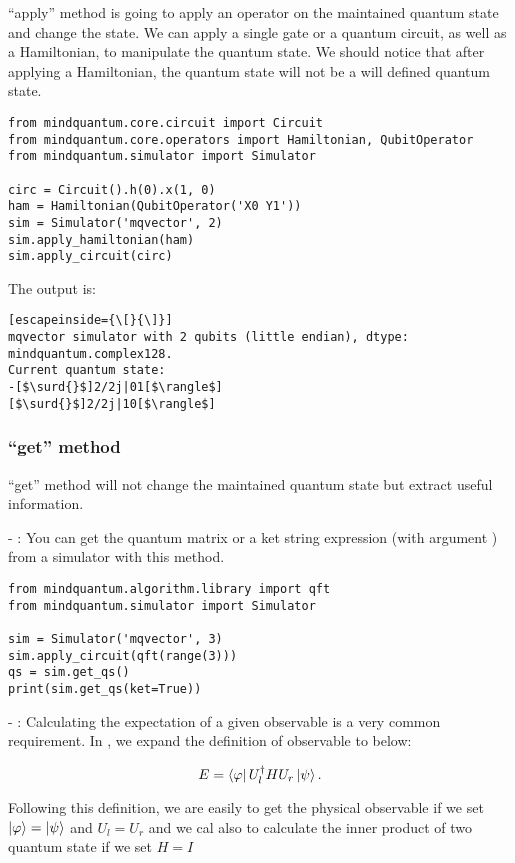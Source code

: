 ``apply'' method is going to apply an operator on the maintained quantum state and change the state. We can apply a single gate or a quantum circuit, as well as a Hamiltonian, to manipulate the quantum state. We should notice that after applying a Hamiltonian, the quantum state will not be a will defined quantum state.

\begin{lstlisting}
from mindquantum.core.circuit import Circuit
from mindquantum.core.operators import Hamiltonian, QubitOperator
from mindquantum.simulator import Simulator

circ = Circuit().h(0).x(1, 0)
ham = Hamiltonian(QubitOperator('X0 Y1'))
sim = Simulator('mqvector', 2)
sim.apply_hamiltonian(ham)
sim.apply_circuit(circ)
\end{lstlisting}
The output is:
\begin{lstlisting}[escapeinside={\[}{\]}]
mqvector simulator with 2 qubits (little endian), dtype: mindquantum.complex128.
Current quantum state:
-[$\surd{}$]2/2j|01[$\rangle$]
[$\surd{}$]2/2j|10[$\rangle$]
\end{lstlisting}

\subsubsection{``get'' method}

``get'' method will not change the maintained quantum state but extract useful information.

- \getqs: You can get the quantum matrix or a ket string expression (with argument ) from a simulator with this method.
\begin{lstlisting}
from mindquantum.algorithm.library import qft
from mindquantum.simulator import Simulator

sim = Simulator('mqvector', 3)
sim.apply_circuit(qft(range(3)))
qs = sim.get_qs()
print(sim.get_qs(ket=True))
\end{lstlisting}

- \getexpectation: Calculating the expectation of a given observable is a very common requirement. In \MindQuantum, we expand the definition of observable to below:

\begin{equation}
    E = \bra{\varphi}U_l^\dagger H U_r \ket{\psi}.
\end{equation}

Following this definition, we are easily to get the physical observable if we set $\ket{\varphi}=\ket{\psi}$ and $U_l = U_r$ and we cal also to calculate the inner product of two quantum state if we set $H=I$


